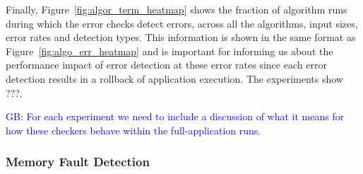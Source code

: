 \documentclass{sig-alternate}
\newcommand{\greg}[1]{%
  \textcolor{blue}{GB: #1}
}
\begin{document}

Finally, Figure~\ref{fig:algor_term_heatmap} shows the fraction of algorithm runs during which the error checks detect errors, across all the algorithms, input sizes, error rates and detection types.
This information is shown in the same format as Figure~\ref{fig:algo_err_heatmap} and is important for informing us about the performance impact of error detection at these error rates since each error detection results in a rollback of application execution.
The experiments show ???.

\greg{For each experiment we need to include a discussion of what it means for how these checkers behave within the full-application runs.}




\subsubsection{Memory Fault Detection}
\label{sec:res_tech:err_det:mem}
\end{document}
